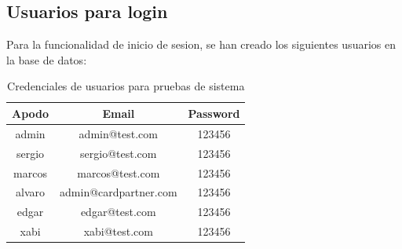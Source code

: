 \documentclass[10pt]{article}
\begin{document}
			\subsection{Usuarios para login}
				Para la funcionalidad de inicio de sesion, se han creado los siguientes usuarios en la base de datos:
				
			\begin{table}[H]
				\centering
				
				\vspace{0.3cm} %
				\begin{tabular}{c c c} 
					\toprule
					\textbf{Apodo} & \textbf{Email} & \textbf{Password} \\
					\midrule
					admin  & admin@test.com        & 123456 \\
					sergio & sergio@test.com       & 123456 \\
					marcos & marcos@test.com       & 123456 \\
					alvaro & admin@cardpartner.com & 123456 \\
					edgar  & edgar@test.com        & 123456 \\
					xabi   & xabi@test.com         & 123456 \\
					\bottomrule
				\end{tabular}
				\caption{Credenciales de usuarios para pruebas de sistema}
				\label{tab:usuarios_prueba}
			\end{table}
		
			
	\newpage
\end{document}

